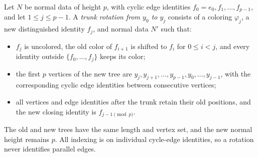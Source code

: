 \begin{definition}
Let $N$ be normal data of height $p$, with cyclic edge identities
$f_0=e_0,f_1,\ldots,f_{p-1}$, and let $1\le j\le p-1$.  A
\emph{trunk rotation from $y_0$ to $y_j$} consists of a coloring
$\varphi_j$, a new distinguished identity $f_j$, and normal data $N'$ such
that:
\begin{itemize}
\item $f_j$ is uncolored, the old color of $f_{i+1}$ is shifted to $f_i$
      for $0\le i<j$, and every identity outside
      $\{f_0,\ldots,f_j\}$ keeps its color;
\item the first $p$ vertices of the new tree are
      $y_j,y_{j+1},\ldots,y_{p-1},y_0,\ldots,y_{j-1}$, with the
      corresponding cyclic edge identities between consecutive vertices;
\item all vertices and edge identities after the trunk retain their old
      positions, and the new closing identity is $f_{j-1\pmod p}$.
\end{itemize}
The old and new trees have the same length and vertex set, and the new
normal height remains $p$.  All indexing is on individual cycle-edge
identities, so a rotation never identifies parallel edges.
\end{definition}
